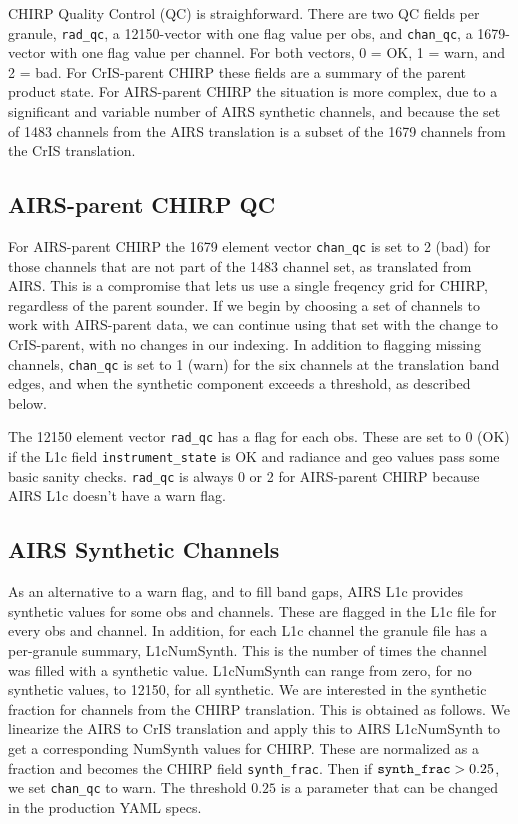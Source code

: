 \documentclass[12pt]{article}
\begin{document}
CHIRP Quality Control (QC) is straighforward.  There are two QC
fields per granule, \texttt{rad\_qc}, a 12150-vector with one flag
value per obs, and \texttt{chan\_qc}, a 1679-vector with one flag
value per channel.  For both vectors, 0 = OK, 1 = warn, and 2 = bad.
For CrIS-parent CHIRP these fields are a summary of the parent
product state.  For AIRS-parent CHIRP the situation is more complex,
due to a significant and variable number of AIRS synthetic channels,
and because the set of 1483 channels from the AIRS translation is a
subset of the 1679 channels from the CrIS translation.

\subsection{AIRS-parent CHIRP QC}

For AIRS-parent CHIRP the 1679 element vector \texttt{chan\_qc} is
set to 2 (bad) for those channels that are not part of the 1483
channel set, as translated from AIRS.  This is a compromise that
lets us use a single freqency grid for CHIRP, regardless of the
parent sounder.  If we begin by choosing a set of channels to work
with AIRS-parent data, we can continue using that set with the
change to CrIS-parent, with no changes in our indexing.  In addition
to flagging missing channels, \texttt{chan\_qc} is set to 1 (warn)
for the six channels at the translation band edges, and when the
synthetic component exceeds a threshold, as described below.

The 12150 element vector \texttt{rad\_qc} has a flag for each obs.
These are set to 0 (OK) if the L1c field \texttt{instrument\_state}
is OK and radiance and geo values pass some basic sanity checks.
\texttt{rad\_qc} is always 0 or 2 for AIRS-parent CHIRP because AIRS
L1c doesn't have a warn flag.

\subsection{AIRS Synthetic Channels}

As an alternative to a warn flag, and to fill band gaps, AIRS L1c
provides synthetic values for some obs and channels.  These are
flagged in the L1c file for every obs and channel.  In addition,
for each L1c channel the granule file has a per-granule summary,
L1cNumSynth.  This is the number of times the channel was filled
with a synthetic value.  L1cNumSynth can range from zero, for no
synthetic values, to 12150, for all synthetic.  We are interested
in the synthetic fraction for channels from the CHIRP translation.
This is obtained as follows.  We linearize the AIRS to CrIS
translation and apply this to AIRS L1cNumSynth to get a
corresponding NumSynth values for CHIRP.  These are normalized as a
fraction and becomes the CHIRP field \texttt{synth\_frac}.  Then if
$\hbox{\texttt{synth\_frac}} > 0.25$, we set \texttt{chan\_qc} to
warn.  The threshold $0.25$ is a parameter that can be changed
in the production YAML specs.
\end{document}
